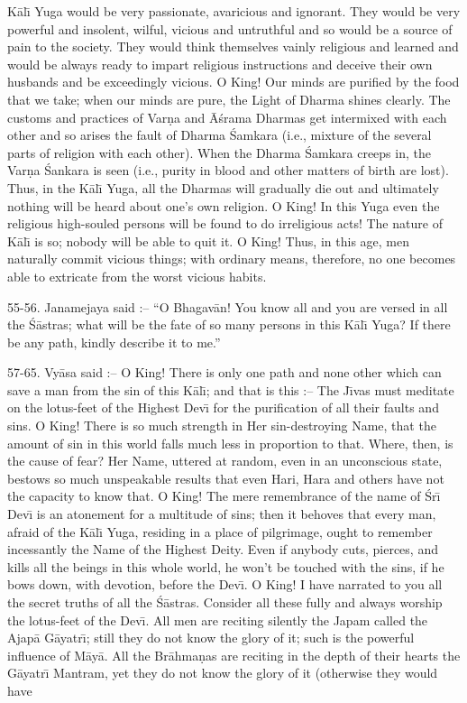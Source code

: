 K\=al\={\i} Yuga would be very passionate, avaricious and ignorant. They would be very powerful and insolent, wilful, vicious and untruthful and so would be a source of pain to the society. They would think themselves vainly religious and learned and would be always ready to impart religious instructions and deceive their own husbands and be exceedingly vicious. O King! Our minds are purified by the food that we take; when our minds are pure, the Light of Dharma shines clearly. The customs and practices of Var\d{n}a and \=A\'srama Dharmas get intermixed with each other and so arises the fault of Dharma \'Samkara (i.e., mixture of the several parts of religion with each other). When the Dharma \'Samkara creeps in, the Var\d{n}a \'Sankara is seen (i.e., purity in blood and other matters of birth are lost). Thus, in the K\=al\={\i} Yuga, all the Dharmas will gradually die out and ultimately nothing will be heard about one's own religion. O King! In this Yuga even the religious high-souled persons will be found to do irreligious acts! The nature of K\=al\={\i} is so; nobody will be able to quit it. O King! Thus, in this age, men naturally commit vicious things; with ordinary means, therefore, no one becomes able to extricate from the worst vicious habits.

55-56. Janamejaya said :-- ``O Bhagav\=an! You know all and you are versed in all the \'S\=astras; what will be the fate of so many persons in this K\=al\={\i} Yuga? If there be any path, kindly describe it to me.''

57-65. Vy\=asa said :-- O King! There is only one path and none other which can save a man from the sin of this K\=al\={\i}; and that is this :-- The J\={\i}vas must meditate on the lotus-feet of the Highest Dev\={\i} for the purification of all their faults and sins. O King! There is so much strength in Her sin-destroying Name, that the amount of sin in this world falls much less in proportion to that. Where, then, is the cause of fear? Her Name, uttered at random, even in an unconscious state, bestows so much unspeakable results that even Hari, Hara and others have not the capacity to know that. O King! The mere remembrance of the name of \'Sr\={\i} Dev\={\i} is an atonement for a multitude of sins; then it behoves that every man, afraid of the K\=al\={\i} Yuga, residing in a place of pilgrimage, ought to remember incessantly the Name of the Highest Deity. Even if anybody cuts, pierces, and kills all the beings in this whole world, he won't be touched with the sins, if he bows down, with devotion, before the Dev\={\i}. O King! I have narrated to you all the secret truths of all the \'S\=astras. Consider all these fully and always worship the lotus-feet of the Dev\={\i}. All men are reciting silently the Japam called the Ajap\=a G\=ayatr\={\i}; still they do not know the glory of it; such is the powerful influence of M\=ay\=a. All the Br\=ahma\d{n}as are reciting in the depth of their hearts the G\=ayatr\={\i} Mantram, yet they do not know the glory of it (otherwise they would have

